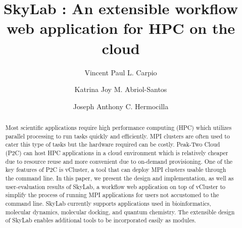 \documentclass[sigconf]{acmart}
\begin{document}
\title{SkyLab : An extensible workflow web application for HPC on the cloud}

\author{Vincent Paul L. Carpio}

\author{Katrina Joy M. Abriol-Santos}

\author{Joseph Anthony C. Hermocilla}



\renewcommand{\shortauthors}{V. P. Carpio et. al.}


\begin{abstract}
Most scientific applications require high performance computing (HPC) which utilizes parallel processing to run tasks quickly and efficiently. MPI clusters are often used to cater this type of tasks but the hardware required can be costly. Peak-Two Cloud (P2C) can host HPC applications in a cloud environment which is relatively cheaper due to resource reuse and more convenient due to on-demand provisioning. One of the key features of P2C is vCluster, a tool that can deploy MPI clusters usable through the command line. In this paper, we present the design and implementation, as well as user-evaluation results of SkyLab, a workflow web application on top of vCluster to simplify the process of running MPI applications for users not accustomed to the command line. SkyLab currently supports applications used in bioinformatics, molecular dynamics, molecular docking, and quantum chemistry. The extensible design of SkyLab enables additional tools to be incorporated easily as modules. 
\end{abstract}

%
%
\end{document}
